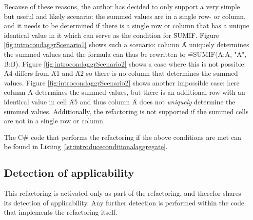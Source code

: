 Because of these reasons, the author has decided to only support a very simple but useful and likely scenario: the summed values are in a single row- or column, and it needs to be determined if there is a single row or column that has a unique identical value in it which can serve as the condition for \f{SUMIF}.
Figure \ref{fig:introcondaggrScenario1} shows such a scenario: column \f{A} uniquely determines the summed values and the formula can thus be rewritten to \f{=SUMIF(A:A, "A", B:B)}.
Figure \ref{fig:introcondaggrScenario2} shows a case where this is not possible: \f{A4} differs from \f{A1} and \f{A2} so there is no column that determines the summed values.
Figure \ref{fig:introcondaggrScenario2} shows another impossible case: here column \f{A} determines the summed values, but there is an additional row with an identical value in cell \f{A5} and thus column \f{A} does not \emph{uniquely} determine the summed values.
Additionally, the refactoring is not supported if the summed cells are not in a single row or column.

The C\# code that performs the refactoring if the above conditions are met can be found in Listing \ref{lst:introduceconditionalaggregate}.

\subsection{Detection of applicability}

This refactoring is activated only as part of the  refactoring, and therefor shares its detection of applicability.
Any further detection is performed within the code that implements the refactoring itself.

%
%
%
%